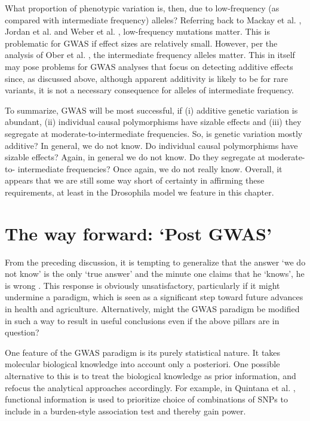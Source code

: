 What proportion of phenotypic variation is, then, due to low-frequency (as compared with intermediate frequency) alleles? Referring back to Mackay et al. \cite{Mackay2012}, Jordan et al. \cite{Jordan2012} and Weber et al. \cite{Weber2012}, low-frequency mutations matter. This is problematic for GWAS if effect sizes are relatively small. However, per the analysis of Ober et al. \cite{Ober2012}, the intermediate frequency alleles matter. This in itself may pose problems for GWAS analyses that focus on detecting additive effects since, as discussed above, although apparent additivity is likely to be for rare variants, it is not a necessary consequence for alleles of intermediate frequency.

To summarize, GWAS will be most successful, if (i) additive genetic variation is abundant, (ii) individual causal polymorphisms have sizable effects and (iii) they segregate at moderate-to-intermediate frequencies. So, is genetic variation mostly additive? In general, we do not know. Do individual causal polymorphisms have sizable effects? Again, in general we do not know. Do they segregate at moderate-to- intermediate frequencies? Once again, we do not really know. Overall, it appears that we are still some way short of certainty in affirming these requirements, at least in the Drosophila model we feature in this chapter.

\section{The way forward: `Post GWAS'}
From the preceding discussion, it is tempting to generalize that the answer ‘we do not know’ is the only ‘true answer’ and the minute one claims that he ‘knows’, he is wrong \cite{Pelevin2001}. This response is obviously unsatisfactory, particularly if it might undermine a paradigm, which is seen as a significant step toward future advances in health and agriculture. Alternatively, might the GWAS paradigm be modified in such a way to result in useful conclusions even if the above pillars are in question?

One feature of the GWAS paradigm is its purely statistical nature. It takes molecular biological knowledge into account only a posteriori. One possible alternative to this is to treat the biological knowledge as prior information, and refocus the analytical approaches accordingly. For example, in Quintana et al. \cite{Quintana2012}, functional information is used to prioritize choice of combinations of SNPs to include in a burden-style association test and thereby gain power.


